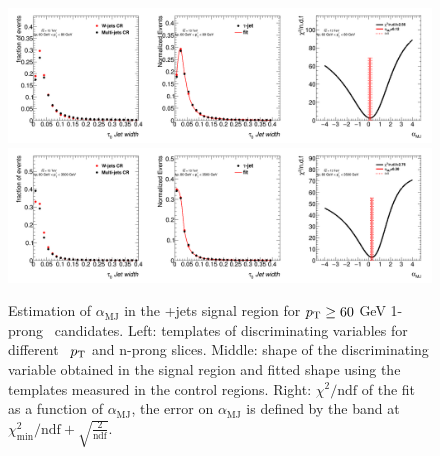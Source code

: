 	\begin{figure}
	\begin{center}
	\includegraphics[width=1\textwidth]{chapters/chapter6_HPlus/images/FFs/FFs_FIT_SR_TAUJET_1_60_80.png}
	\includegraphics[width=1\textwidth]{chapters/chapter6_HPlus/images/FFs/FFs_FIT_SR_TAUJET_1_80_3500.png}
	\end{center}
	\caption{
	Estimation of $\alpha_\mathrm{MJ}$ in the \tauhad+jets signal region for $p_{\text{T}} \geq 60$ GeV
	1-prong \tauhad\ candidates. Left: templates of discriminating variables for different \tauhad\ $p_{\text{T}}$
	and n-prong slices. Middle: shape of the discriminating variable obtained in the signal region and fitted
	shape using the templates measured in the control regions. Right: $\chi^2/\mathrm{ndf}$ of the fit as a
	function of $\alpha_\mathrm{MJ}$, the error on $\alpha_\mathrm{MJ}$ is defined by the band at
	$\chi^2_\mathrm{min}/\mathrm{ndf}+\sqrt{\frac{2}{\mathrm{ndf}}}$.
	}
	\label{fig:mm:Fits:region3_2}
	\end{figure}

